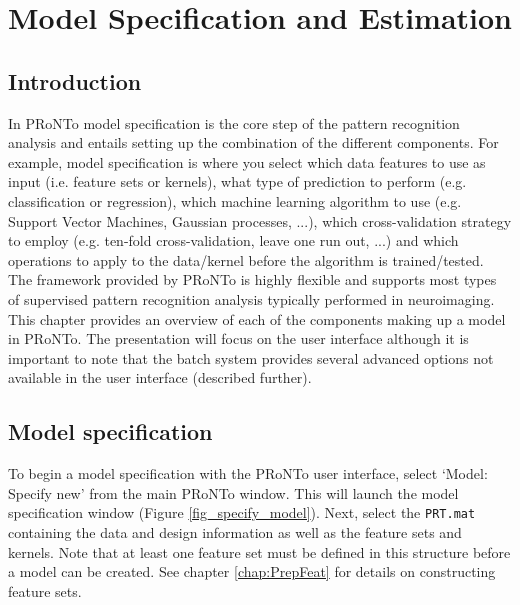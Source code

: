 %

\chapter{Model Specification and Estimation}
\label{chap:ModelCrossV}
\minitoc

\section{Introduction}

In PRoNTo model specification is the core step of the pattern recognition analysis and  entails setting up the combination of the different components. For example, model specification is where you select which data features to use as input (i.e. feature sets or kernels), what type of prediction to perform (e.g. classification or regression), which machine learning algorithm to use (e.g. Support Vector Machines, Gaussian processes, ...), which cross-validation strategy to employ (e.g. ten-fold cross-validation, leave one run out, ...) and which operations to apply to the data/kernel before the algorithm is trained/tested. The framework provided by PRoNTo is highly flexible and supports most types of supervised pattern recognition analysis typically performed in neuroimaging. This chapter provides an overview of each of the components making up a model in PRoNTo. The presentation will focus on the user interface although it is important to note that the batch system provides several advanced options not available in the user interface (described further).

\section{Model specification}

To begin a model specification with the PRoNTo user interface, select `Model: Specify new' from the main PRoNTo window. This will launch the model specification window (Figure \ref{fig_specify_model}). Next, select the \texttt{PRT.mat} containing the data and design information as well as the feature sets and kernels. Note that at least one feature set must be defined in this structure before a model can be created. See chapter \ref{chap:PrepFeat} for details on constructing feature sets.
\\

